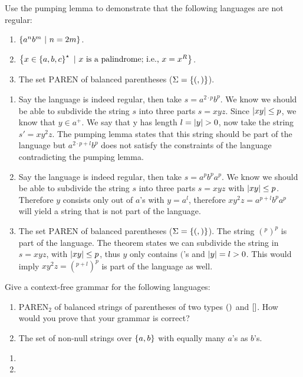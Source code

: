 \documentclass{article}
\begin{document}
\begin{exercise}
Use the pumping lemma to demonstrate that the following languages are not regular:
\begin{enumerate}
 \item $\left\{ a^nb^m\ |\ n = 2m \right\}$.
 \item $\left\{ x\in\left\{ a,b,c \right\}^{\star}\ |\ \mbox{$x$ is a palindrome; i.e., $x=x^R$} \right\}$.
 \item The set $\mbox{PAREN}$ of balanced parentheses ($\Sigma=\left\{ (,) \right\}$).
\end{enumerate}
\begin{answer}
\begin{enumerate}
 \item Say the language is indeed regular, then take $s=a^{2\cdot p}b^p$. We know we should be able to subdivide the string $s$ into three parts $s=xyz$. Since $\left|xy\right|\leq p$, we know that $y\in a^+$. We say that y has length $l=\abs{y}>0$, now take the string $s'=xy^2z$. The pumping lemma states that this string should be part of the language but $a^{2\cdot p+l}b^p$ does not satisfy the constraints of the language contradicting the pumping lemma.
 \item Say the language is indeed regular, then take $s=a^pb^pa^p$. We know we should be able to subdivide the string $s$ into three parts $s=xyz$ with $\left|xy\right|\leq p$. Therefore $y$ consists only out of $a$'s with $y=a^l$, therefore $xy^2z=a^{p+l}b^pa^p$ will yield a string that is not part of the language.
 \item The set $\mbox{PAREN}$ of balanced parentheses ($\Sigma=\left\{ (,) \right\}$). The string $(^p)^p$ is part of the language. The theorem states we can subdivide the string in $s=xyz$, with $\left|xy\right|\leq p$, thus $y$ only contains $($'s and $\left|y\right|=l>0$. This would imply $xy^2z=(^{p+l})^{p}$ is part of the language as well.
\end{enumerate}
\end{answer}
\end{exercise}
\begin{exercise}
Give a context-free grammar for the following languages:
\begin{enumerate}
 \item $\mbox{PAREN}_2$ of balanced strings of parentheses of two types $\left(  \right)$ and $\left[  \right]$. How would you prove that your grammar is correct?
 \item The set of non-null strings over $\left\{ a,b \right\}$ with equally many $a$'s as $b$'s.
\end{enumerate}
\begin{answer}
\begin{enumerate}
 \item {}
 \item {}
\end{enumerate}
\end{answer}
\end{exercise}
\end{document}
